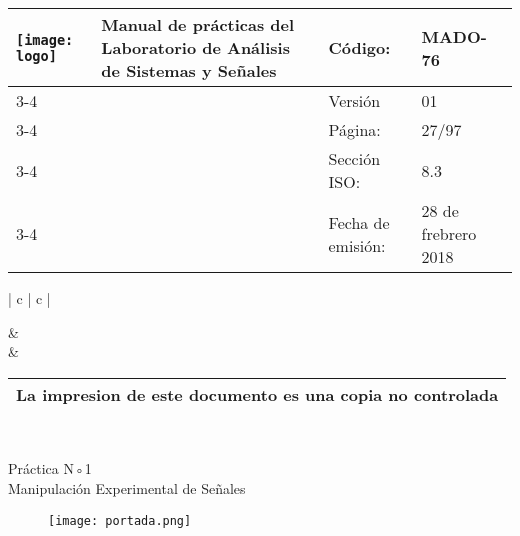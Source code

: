 
	\centering
	\begin{tabular}{ |	p{30 mm}|	p{61 mm}	|	p{33mm}	| p{43mm}	| } 
	\hline
	
	
	\multirow{4}{30mm}{\centering \texttt{[image: logo]}} &
	\multirow{4}{61mm}{\centering \textbf{ \textbf{Manual de prácticas del Laboratorio de Análisis de Sistemas y Señales}}}    & Código: & MADO-76 \\
	\cline{3-4}
	& &  Versión & 01 \\
	\cline{3-4}
	& & Página: & 27/97 \\ \cline{3-4}
	& & Sección ISO: & 8.3 \\ \cline{3-4}
	& & Fecha de emisión: & 28 de frebrero 2018 \\
	\hline
	\end{tabular}
\begin{tabular}{ |	c |	c	| } 
	
	 &
	   \\
	& \\ \hline
\end{tabular}
\begin{tabular}{|p{180mm}|}
	\multirow{1}{180mm}{ \centering La impresion de este documento es una copia no controlada }  \\ \hline \end{tabular} \\

\vspace{1cm}

{\Huge Práctica N◦1 \\ Manipulación Experimental de Señales}

\hspace{5cm}

\begin{figure}[!h]
	\centering
	\texttt{[image: portada.png]}
\end{figure}

